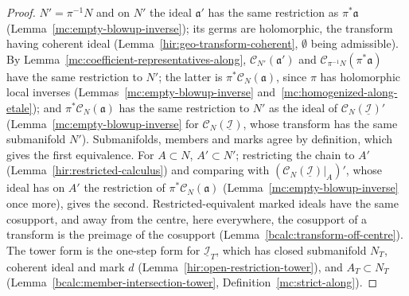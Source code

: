 \begin{proof}
\leanok
\(N'=\pi^{-1}N\) and on \(N'\) the ideal \(\mathfrak a'\) has the same restriction as \(\pi^*\mathfrak a\) (Lemma~\ref{mc:empty-blowup-inverse}); its germs are holomorphic, the
transform having coherent ideal (Lemma~\ref{hir:geo-transform-coherent}, \(\emptyset\) being admissible). By Lemma~\ref{mc:coefficient-representatives-along},
\(\mathcal C_{N'}(\mathfrak a')\) and \(\mathcal C_{\pi^{-1}N}(\pi^*\mathfrak a)\) have the same restriction to \(N'\); the latter is \(\pi^*\mathcal C_N(\mathfrak a)\), since \(\pi\) has
holomorphic local inverses (Lemmas~\ref{mc:empty-blowup-inverse} and~\ref{mc:homogenized-along-etale}); and \(\pi^*\mathcal C_N(\mathfrak a)\) has the same restriction to
\(N'\) as the ideal of \(\mathcal C_N(\underline{\mathcal I})'\) (Lemma~\ref{mc:empty-blowup-inverse} for \(\mathcal C_N(\underline{\mathcal I})\), whose transform has the same
submanifold \(N'\)). Submanifolds, members and marks agree by definition, which gives the first equivalence. For \(A\subset N\), \(A'\subset N'\); restricting the chain to
\(A'\) (Lemma~\ref{hir:restricted-calculus}) and comparing with \((\mathcal C_N(\underline{\mathcal I})|_A)'\), whose ideal has on \(A'\) the restriction of
\(\pi^*\mathcal C_N(\mathfrak a)\) (Lemma~\ref{mc:empty-blowup-inverse} once more), gives the second. Restricted-equivalent marked ideals have the same cosupport, and away from
the centre, here everywhere, the cosupport of a transform is the preimage of the cosupport (Lemma~\ref{bcalc:transform-off-centre}). The tower form is the one-step form
for \(\underline{\mathcal I}_T\), which has closed submanifold \(N_T\), coherent ideal and mark \(d\) (Lemma~\ref{hir:open-restriction-tower}), and \(A_T\subset N_T\)
(Lemma~\ref{bcalc:member-intersection-tower}, Definition~\ref{mc:strict-along}).
\end{proof}


